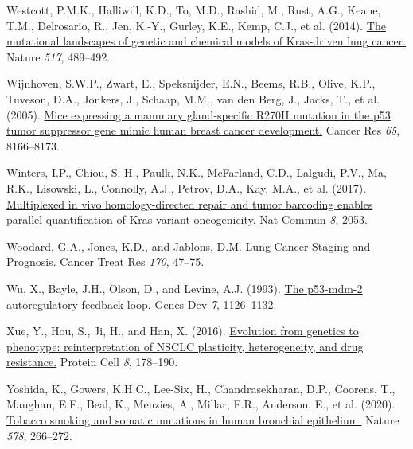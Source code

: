 \begin{CSLReferences}{0}{0}
\leavevmode{}%
Westcott, P.M.K., Halliwill, K.D., To, M.D., Rashid, M., Rust, A.G., Keane, T.M., Delrosario, R., Jen, K.-Y., Gurley, K.E., Kemp, C.J., et al. (2014). \href{https://doi.org/10.1038/nature13898}{The mutational landscapes of genetic and chemical models of Kras-driven lung cancer.} Nature \emph{517}, 489--492.

\leavevmode{}%
Wijnhoven, S.W.P., Zwart, E., Speksnijder, E.N., Beems, R.B., Olive, K.P., Tuveson, D.A., Jonkers, J., Schaap, M.M., van den Berg, J., Jacks, T., et al. (2005). \href{https://doi.org/10.1158/0008-5472.can-05-1650}{Mice expressing a mammary gland-specific R270H mutation in the p53 tumor suppressor gene mimic human breast cancer development.} Cancer Res \emph{65}, 8166--8173.

\leavevmode{}%
Winters, I.P., Chiou, S.-H., Paulk, N.K., McFarland, C.D., Lalgudi, P.V., Ma, R.K., Lisowski, L., Connolly, A.J., Petrov, D.A., Kay, M.A., et al. (2017). \href{https://doi.org/10.1038/s41467-017-01519-y}{Multiplexed in vivo homology-directed repair and tumor barcoding enables parallel quantification of Kras variant oncogenicity.} Nat Commun \emph{8}, 2053.

\leavevmode{}%
Woodard, G.A., Jones, K.D., and Jablons, D.M. \href{https://doi.org/10.1007/978-3-319-40389-2_3}{Lung Cancer Staging and Prognosis.} Cancer Treat Res \emph{170}, 47--75.

\leavevmode{}%
Wu, X., Bayle, J.H., Olson, D., and Levine, A.J. (1993). \href{https://doi.org/10.1101/gad.7.7a.1126}{The p53-mdm-2 autoregulatory feedback loop.} Genes Dev \emph{7}, 1126--1132.

\leavevmode{}%
Xue, Y., Hou, S., Ji, H., and Han, X. (2016). \href{https://doi.org/10.1007/s13238-016-0330-1}{Evolution from genetics to phenotype: reinterpretation of NSCLC plasticity, heterogeneity, and drug resistance.} Protein Cell \emph{8}, 178--190.

\leavevmode{}%
Yoshida, K., Gowers, K.H.C., Lee-Six, H., Chandrasekharan, D.P., Coorens, T., Maughan, E.F., Beal, K., Menzies, A., Millar, F.R., Anderson, E., et al. (2020). \href{https://doi.org/10.1038/s41586-020-1961-1}{Tobacco smoking and somatic mutations in human bronchial epithelium.} Nature \emph{578}, 266--272.


\end{CSLReferences}
